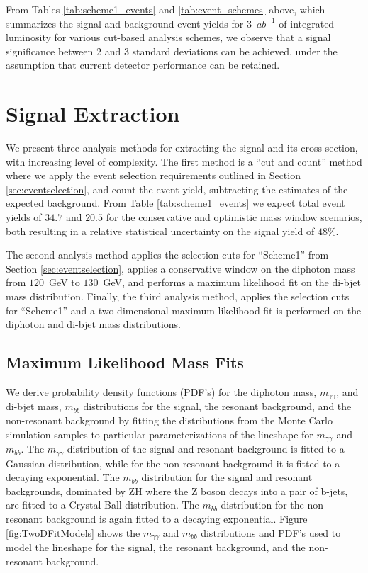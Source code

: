\documentclass{cmspaper}
\begin{document}
 
From Tables \ref{tab:scheme1_events} and \ref{tab:event_schemes} above, 
which summarizes the signal and background event yields for $3$~$ab^{-1}$ of integrated luminosity for
various cut-based analysis schemes, we observe that a signal
significance between $2$ and $3$ standard deviations can be achieved,
under the assumption that current detector performance can be retained.


\section{Signal Extraction}
\label{sec:signalextraction}

We present three analysis methods for extracting the signal and its cross section, with increasing
level of complexity. The first method is a ``cut and count'' method where we apply
the event selection requirements outlined in Section \ref{sec:eventselection}, 
and count the event yield, subtracting the estimates of the expected background. From Table
\ref{tab:scheme1_events} we expect total event yields of $34.7$ and $20.5$ for the conservative and 
optimistic mass window scenarios, both resulting in a relative statistical uncertainty on the 
signal yield of $48\%$.

The second analysis method applies the selection cuts for ``Scheme1'' from 
Section \ref{sec:eventselection}, applies a conservative window on the diphoton 
mass from $120$~GeV to $130$~GeV, and performs a maximum
likelihood fit on the di-bjet mass distribution. Finally, the third analysis method, applies
the selection cuts for ``Scheme1'' and a two dimensional maximum likelihood fit is performed
on the diphoton and di-bjet mass distributions.

\subsection{Maximum Likelihood Mass Fits}
\label{sec:massfits}

We derive probability density functions (PDF's) for the diphoton mass, $m_{\gamma\gamma}$, and di-bjet mass, $m_{bb}$
 distributions for the signal, the resonant background, and the non-resonant background by 
fitting the distributions from the Monte Carlo simulation samples to particular parameterizations 
of the lineshape for $m_{\gamma\gamma}$ and $m_{bb}$. The $m_{\gamma\gamma}$
distribution of the signal and resonant background is fitted to a Gaussian distribution, while for
the non-resonant background it is fitted to a decaying exponential. The $m_{bb}$ distribution 
for the signal and resonant backgrounds, dominated by ZH where the Z boson decays into a pair of b-jets,
are fitted to a Crystal Ball distribution. The $m_{bb}$ distribution for the non-resonant background is
again fitted to a decaying exponential. Figure \ref{fig:TwoDFitModels} shows the $m_{\gamma\gamma}$
and $m_{bb}$ distributions and PDF's used to model the lineshape for the signal, the resonant background,
and the non-resonant background.
 
\end{document}
